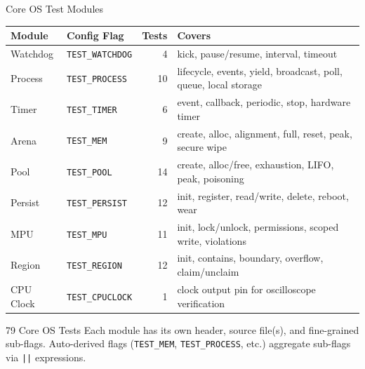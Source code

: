 \documentclass[aspectratio=169, 10pt]{beamer}
\begin{document}
\begin{frame}{Core OS Test Modules}
\begin{table}
\centering
\small
\begin{tabular}{@{}llrl@{}}
\toprule
\textbf{Module} & \textbf{Config Flag} & \textbf{Tests} & \textbf{Covers} \\
\midrule
Watchdog    & \texttt{TEST\_WATCHDOG}  & 4  & kick, pause/resume, interval, timeout \\
Process     & \texttt{TEST\_PROCESS}   & 10 & lifecycle, events, yield, broadcast, poll, queue, local storage \\
Timer       & \texttt{TEST\_TIMER}     & 6  & event, callback, periodic, stop, hardware timer \\
Arena       & \texttt{TEST\_MEM}       & 9  & create, alloc, alignment, full, reset, peak, secure wipe \\
Pool        & \texttt{TEST\_POOL}      & 14 & create, alloc/free, exhaustion, LIFO, peak, poisoning \\
Persist     & \texttt{TEST\_PERSIST}   & 12 & init, register, read/write, delete, reboot, wear \\
MPU         & \texttt{TEST\_MPU}       & 11 & init, lock/unlock, permissions, scoped write, violations \\
Region      & \texttt{TEST\_REGION}    & 12 & init, contains, boundary, overflow, claim/unclaim \\
CPU Clock   & \texttt{TEST\_CPUCLOCK}  & 1  & clock output pin for oscilloscope verification \\
\bottomrule
\end{tabular}
\end{table}

\vspace{0.3em}
\begin{block}{79 Core OS Tests}
Each module has its own header, source file(s), and fine-grained sub-flags.
Auto-derived flags (\texttt{TEST\_MEM}, \texttt{TEST\_PROCESS}, etc.)
aggregate sub-flags via \texttt{||} expressions.
\end{block}
\end{frame}
\end{document}
